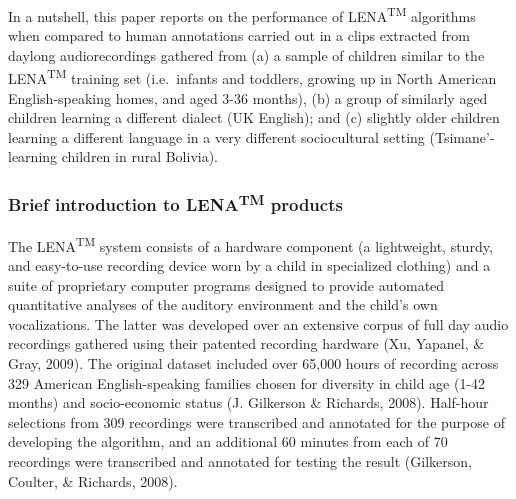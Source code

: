 \documentclass[english,floatsintext,man]{apa6}
\begin{document}
In a nutshell, this paper reports on the performance of
LENA\textsuperscript{TM} algorithms when compared to human annotations
carried out in a clips extracted from daylong audiorecordings gathered
from (a) a sample of children similar to the LENA\textsuperscript{TM}
training set (i.e.~infants and toddlers, growing up in North American
English-speaking homes, and aged 3-36 months), (b) a group of similarly
aged children learning a different dialect (UK English); and (c)
slightly older children learning a different language in a very
different sociocultural setting (Tsimane'-learning children in rural
Bolivia).

\subsubsection{\texorpdfstring{Brief introduction to
LENA\textsuperscript{TM}
products}{Brief introduction to LENATM products}}\label{brief-introduction-to-lenatm-products}

The LENA\textsuperscript{TM} system consists of a hardware component (a
lightweight, sturdy, and easy-to-use recording device worn by a child in
specialized clothing) and a suite of proprietary computer programs
designed to provide automated quantitative analyses of the auditory
environment and the child's own vocalizations. The latter was developed
over an extensive corpus of full day audio recordings gathered using
their patented recording hardware (Xu, Yapanel, \& Gray, 2009). The
original dataset included over 65,000 hours of recording across 329
American English-speaking families chosen for diversity in child age
(1-42 months) and socio-economic status (J. Gilkerson \& Richards,
2008). Half-hour selections from 309 recordings were transcribed and
annotated for the purpose of developing the algorithm, and an additional
60 minutes from each of 70 recordings were transcribed and annotated for
testing the result (Gilkerson, Coulter, \& Richards, 2008).
\end{document}
